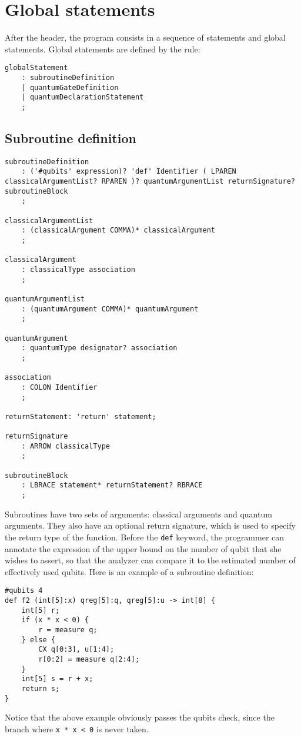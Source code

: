 \documentclass[12pt,a4paper]{report}
\theoremstyle{definition}
\theoremstyle{definition}
\theoremstyle{definition}
\begin{document}
\section{Global statements}
After the header, the program consists in a sequence of statements and global statements. Global statements are defined by the rule:
\begin{lstlisting}
globalStatement
    : subroutineDefinition
    | quantumGateDefinition
    | quantumDeclarationStatement
    ;
\end{lstlisting}



\subsection{Subroutine definition}
\begin{lstlisting}
subroutineDefinition
    : ('#qubits' expression)? 'def' Identifier ( LPAREN classicalArgumentList? RPAREN )? quantumArgumentList returnSignature? subroutineBlock
    ;

classicalArgumentList
    : (classicalArgument COMMA)* classicalArgument
    ;

classicalArgument
    : classicalType association
    ;

quantumArgumentList
    : (quantumArgument COMMA)* quantumArgument
    ;

quantumArgument
    : quantumType designator? association
    ;

association
    : COLON Identifier
    ;

returnStatement: 'return' statement;

returnSignature
    : ARROW classicalType
    ;

subroutineBlock
    : LBRACE statement* returnStatement? RBRACE
    ;
\end{lstlisting}

Subroutines have two sets of arguments: classical arguments and quantum arguments. They also have an optional return signature, which is used to specify the return type of the function.
Before the \texttt{def} keyword, the programmer can annotate the expression of the upper bound on the number of qubit that she wishes to assert, so that the analyzer can compare it to the estimated number of effectively used qubits.
Here is an example of a subroutine definition:
\begin{lstlisting}
#qubits 4
def f2 (int[5]:x) qreg[5]:q, qreg[5]:u -> int[8] {
    int[5] r;
    if (x * x < 0) {
        r = measure q;
    } else {
        CX q[0:3], u[1:4];
        r[0:2] = measure q[2:4];
    }
    int[5] s = r + x;
    return s;
}
\end{lstlisting}
Notice that the above example obviously passes the qubits check, since the branch where \texttt{x * x < 0} is never taken.
\end{document}
